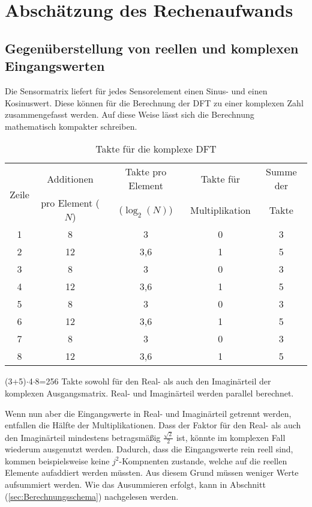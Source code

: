 \section{Abschätzung des Rechenaufwands}\label{sec:abschaetzung_Rechenaufwand}

\subsection{Gegenüberstellung von reellen und komplexen Eingangswerten}
Die Sensormatrix liefert für jedes Sensorelement einen Sinus- und einen Kosinuswert. Diese können für die Berechnung der DFT zu einer komplexen Zahl zusammengefasst werden. 
Auf diese Weise lässt sich die Berechnung mathematisch kompakter schreiben.

\begin{table}[htbp]
\centering
\caption{Takte für die komplexe DFT}
\begin{tabular}{ccccc}
\hline
\multirow{2}{*}{Zeile} & Additionen & Takte pro Element & Takte für & Summe der\\
      & pro Element ($N$) & ($\log_2(N)$) & Multiplikation & Takte\\
\hline
 1& 8  & 3   &0 &3\\
 2& 12 & 3,6 &1 &5\\
 3& 8  & 3   &0 &3\\
 4& 12 & 3,6 &1 &5\\
 5& 8  & 3   &0 &3\\
 6& 12 & 3,6 &1 &5\\
 7& 8  & 3   &0 &3\\
 8& 12 & 3,6 &1 &5\\
\hline
\end{tabular}
\end{table}

(3+5)$\cdot$4$\cdot$8=256 Takte sowohl für den Real- als auch den Imaginärteil der komplexen Ausgangsmatrix. Real- und Imaginärteil werden parallel berechnet.

Wenn nun aber die Eingangswerte in Real- und Imaginärteil getrennt werden, entfallen die Hälfte der Multiplikationen. Dass der Faktor für den Real- als auch den Imaginärteil 
mindestens betragsmäßig $\frac{\sqrt{2}}{2}$ ist, könnte im komplexen Fall wiederum ausgenutzt werden.
Dadurch, dass die Eingangswerte rein reell sind, kommen beispielsweise keine $j^2$-Kompnenten zustande, welche auf die reellen Elemente aufaddiert werden müssten.
Aus diesem Grund müssen weniger Werte aufsummiert werden. Wie das Ausummieren erfolgt, kann in Abschnitt (\ref{sec:Berechnungsschema}) nachgelesen werden.

